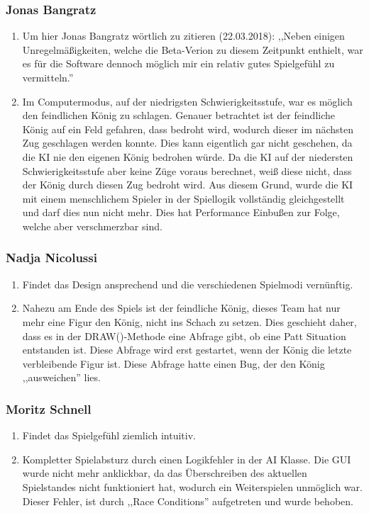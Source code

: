 \documentclass[12pt,a4paper]{article}
\begin{document}
{\subsubsection*{Jonas Bangratz}
\begin{enumerate}[I]
	\item{Um hier Jonas Bangratz wörtlich zu zitieren (22.03.2018): ,,Neben einigen Unregelmäßigkeiten, welche die Beta-Verion zu diesem Zeitpunkt enthielt, war es für die Software dennoch möglich mir ein relativ gutes Spielgefühl zu vermitteln.''}
	\item{Im Computermodus, auf der niedrigsten Schwierigkeitsstufe, war es möglich den feindlichen König zu schlagen. Genauer betrachtet ist der feindliche König auf ein Feld gefahren, dass bedroht wird, wodurch dieser im nächsten Zug geschlagen werden konnte. Dies kann eigentlich gar nicht geschehen, da die KI nie den eigenen König bedrohen würde. Da die KI auf der niedersten Schwierigkeitsstufe aber keine Züge voraus berechnet, weiß diese nicht, dass der König durch diesen Zug bedroht wird. Aus diesem Grund, wurde die KI mit einem menschlichem Spieler in der Spiellogik vollständig gleichgestellt und darf dies nun nicht mehr. Dies hat Performance Einbußen zur Folge, welche aber verschmerzbar sind. }
\end{enumerate}

\subsubsection*{Nadja Nicolussi}
\begin{enumerate}[I]
	\item{Findet das Design ansprechend und die verschiedenen Spielmodi vernünftig.}
	\item{Nahezu am Ende des Spiels ist der feindliche König, dieses Team hat nur mehr eine Figur den König, nicht ins Schach zu setzen. Dies geschieht daher, dass es in der DRAW()-Methode eine Abfrage gibt, ob eine Patt Situation entstanden ist. Diese Abfrage wird erst gestartet, wenn der König die letzte verbleibende Figur ist. Diese Abfrage hatte einen Bug, der den König ,,ausweichen'' lies.}
\end{enumerate}

\subsubsection*{Moritz Schnell}
\begin{enumerate}[I]
	\item{Findet das Spielgefühl ziemlich intuitiv.}
	\item{Kompletter Spielabsturz durch einen Logikfehler in der AI Klasse. Die GUI wurde nicht mehr anklickbar, da das Überschreiben des aktuellen Spielstandes nicht funktioniert hat, wodurch ein Weiterspielen unmöglich war. Dieser Fehler, ist durch ,,Race Conditions'' aufgetreten und wurde behoben.}
\end{enumerate}

}
\end{document}

